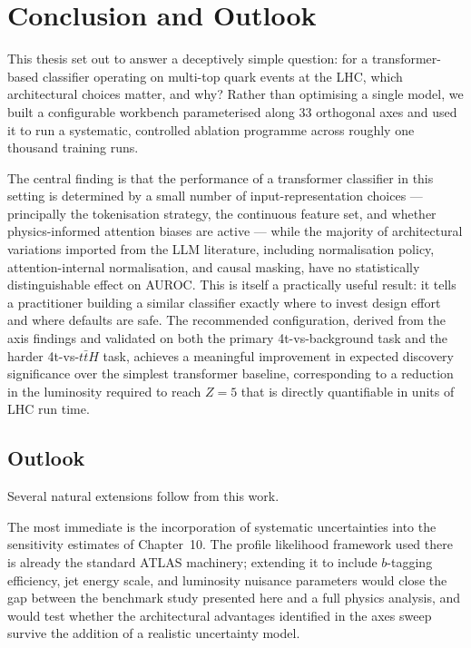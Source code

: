 \chapter{Conclusion and Outlook}

This thesis set out to answer a deceptively simple question: for a transformer-based classifier
operating on multi-top quark events at the LHC, which architectural choices matter, and why?
Rather than optimising a single model, we built a configurable workbench parameterised along
33 orthogonal axes and used it to run a systematic, controlled ablation programme across
roughly one thousand training runs.

The central finding is that the performance of a transformer classifier in this setting is
determined by a small number of input-representation choices --- principally the tokenisation
strategy, the continuous feature set, and whether physics-informed attention biases are active
--- while the majority of architectural variations imported from the LLM literature, including
normalisation policy, attention-internal normalisation, and causal masking, have no statistically
distinguishable effect on AUROC.
This is itself a practically useful result: it tells a practitioner building a similar
classifier exactly where to invest design effort and where defaults are safe.
The recommended configuration, derived from the axis findings and validated on both the primary
4t-vs-background task and the harder 4t-vs-$t\bar{t}H$ task, achieves a meaningful improvement
in expected discovery significance over the simplest transformer baseline, corresponding to a
reduction in the luminosity required to reach $Z = 5$ that is directly quantifiable in
units of LHC run time.

\section*{Outlook}

Several natural extensions follow from this work.

The most immediate is the incorporation of systematic uncertainties into the sensitivity
estimates of Chapter~10.
The profile likelihood framework used there is already the standard ATLAS machinery; extending
it to include $b$-tagging efficiency, jet energy scale, and luminosity nuisance parameters
would close the gap between the benchmark study presented here and a full physics analysis,
and would test whether the architectural advantages identified in the axes sweep survive the
addition of a realistic uncertainty model.

